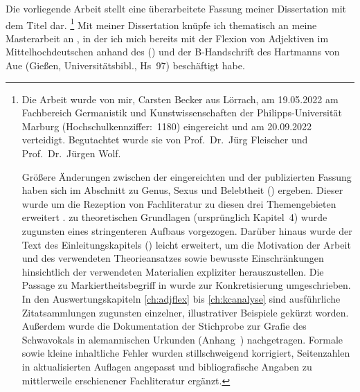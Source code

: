 \addchap{\lsPrefaceTitle}

Die vorliegende Arbeit stellt eine überarbeitete Fassung meiner Dissertation
mit dem Titel  dar.%
%
	\footnote{Die Arbeit wurde von mir, Carsten Becker aus Lörrach, am
		19.05.2022 am Fachbereich Germanistik und Kunstwissenschaften der
		Philipps-Universität Marburg (Hochschulkennziffer:~1180) eingereicht
		und am 20.09.2022 verteidigt. Begutachtet wurde sie von Prof.~Dr.~Jürg
		Fleischer und Prof.~Dr.~Jürgen Wolf.

		Größere Änderungen zwischen der eingereichten und der publizierten
		Fassung haben sich im Abschnitt zu Genus, Sexus und Belebtheit
		() ergeben. Dieser wurde um die Rezeption von
		Fachliteratur zu diesen drei Themengebieten erweitert%
		.  zu theoretischen Grundlagen (ursprünglich
		Kapitel~4) wurde zugunsten eines stringenteren Aufbaus vorgezogen.
		Darüber hinaus wurde der Text des Einleitungskapitels
		() leicht erweitert, um die Motivation der
		Arbeit und des verwendeten Theorieansatzes sowie bewusste
		Einschränkungen hinsichtlich der verwendeten Materialien expliziter
		herauszustellen. Die Passage zu 
		Markiertheitsbegriff in  wurde zur
		Konkretisierung umgeschrieben. In den Aus\-wertungs\-kapi\-teln
		\ref{ch:adjflex} bis \ref{ch:kcanalyse} sind ausführliche
		Zitatsammlungen zugunsten einzelner, illustrativer Beispiele gekürzt
		worden. Außerdem wurde die Dokumentation der Stich\-probe zur Grafie
		des Schwa\-vokals in alemannischen Urkunden
		(Anhang~) nachgetragen. Formale sowie kleine
		inhaltliche Fehler wurden stillschweigend korrigiert, Sei\-ten\-zahlen
		in aktualisierten Auflagen angepasst und bibliografische Angaben zu
		mittlerweile erschienener Fachliteratur ergänzt. }
%
Mit meiner Dissertation knüpfe ich thematisch an meine Masterarbeit an
\autocite{becker2016}, in der ich mich bereits mit der Flexion von Adjektiven
im Mittelhochdeutschen anhand des  (\CAO) und der B-Handschrift des  Hartmanns von
Aue (Gießen, Universitätsbibl., Hs~97) beschäftigt habe.

